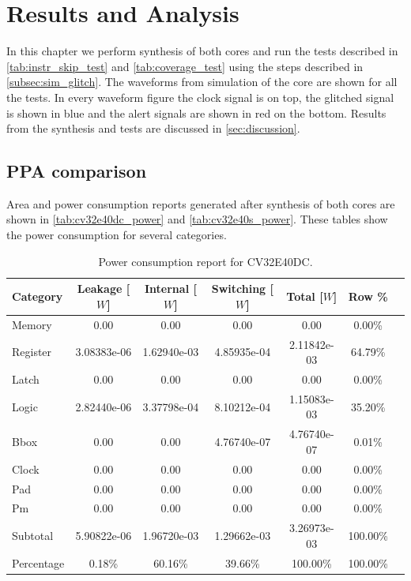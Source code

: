 \chapter{Results and Analysis}
\label{chap5}

In this chapter we perform synthesis of both cores and run the tests described in \autoref{tab:instr_skip_test} and \autoref{tab:coverage_test} using the steps described in \autoref{subsec:sim_glitch}. The waveforms from simulation of the core are shown for all the tests. In every waveform figure the clock signal is on top, the glitched signal is shown in blue and the alert signals are shown in red on the bottom. Results from the synthesis and tests are discussed in \autoref{sec:discussion}.

\section{PPA comparison}
\label{sec:synth_comparison}

Area and power consumption reports generated after synthesis of both cores are shown in \autoref{tab:cv32e40dc_power} and \autoref{tab:cv32e40s_power}. These tables show the power consumption for several categories. 

\begin{table}[h]
\centering
\caption{Power consumption report for CV32E40DC.}
\label{tab:cv32e40dc_power}
\begin{tabular}{l|cccccc}
\toprule
Category & Leakage [$W$] & Internal [$W$] & Switching [$W$] & Total [$W$] & Row \% \\
\midrule
\rowcolor{black!20} Memory & 0.00 & 0.00 & 0.00 & 0.00 & 0.00\% \\
Register & 3.08383e-06 & 1.62940e-03 & 4.85935e-04 & 2.11842e-03 & 64.79\% \\
\rowcolor{black!20}Latch & 0.00 & 0.00 & 0.00 & 0.00 & 0.00\% \\
Logic & 2.82440e-06 & 3.37798e-04 & 8.10212e-04 & 1.15083e-03 & 35.20\% \\
\rowcolor{black!20}Bbox & 0.00 & 0.00 & 4.76740e-07 & 4.76740e-07 & 0.01\% \\
Clock & 0.00 & 0.00 & 0.00 & 0.00 & 0.00\% \\
\rowcolor{black!20}Pad & 0.00 & 0.00 & 0.00 & 0.00 & 0.00\% \\
Pm & 0.00 & 0.00 & 0.00 & 0.00 & 0.00\% \\
\midrule
\rowcolor{black!20} Subtotal & 5.90822e-06 & 1.96720e-03 & 1.29662e-03 & 3.26973e-03 & 100.00\% \\
Percentage & 0.18\% & 60.16\% & 39.66\% & 100.00\% & 100.00\% \\
\bottomrule
\end{tabular}
\end{table}

